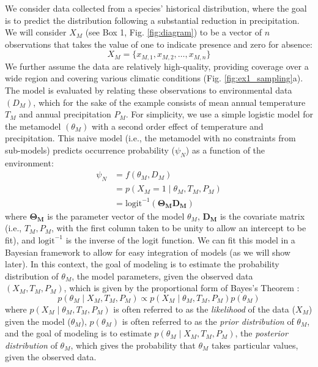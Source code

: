 \documentclass[11pt]{article}
\begin{document}
We consider data collected from a species' historical distribution, where the goal is to predict the distribution following a substantial reduction in precipitation. 
We will consider \(X_M\) (see Box 1, Fig. \ref{fig:diagram}) to be a vector of $n$ observations that takes the value of one to indicate presence and zero for absence:
\begin{equation}
X_M = \{x_{M,1}, x_{M,2}, \ldots, x_{M,n}\}
\end{equation}
We further assume the data are relatively high-quality, providing coverage over a wide region and covering various climatic conditions (Fig. \ref{fig:ex1_sampling}a). 
The model is evaluated by relating these observations to environmental data \((D_M)\), which for the sake of the example consists of mean annual temperature $T_M$ and annual precipitation $P_M$. 
For simplicity, we use a simple logistic model for the metamodel \((\theta_M)\) with a second order effect of temperature and precipitation. 
This naive model (i.e., the metamodel with no constraints from sub-models) predicts  occurrence probability (\(\psi_N\)) as a function of the environment:
\begin{equation}
\begin{aligned}
	\psi_N &= f\left(\theta_M, D_M \right) \\
	&= p \left (X_M = 1 \mid \theta_M, T_M, P_M \right) \\
	&=\text{logit}^{-1}\left( \mathbf{\Theta_M} \mathbf{D_M} \right)
\end{aligned}
\end{equation}
where \(\mathbf{\Theta_M}\) is the parameter vector of the model \(\theta_M\), \(\mathbf{D_M} \) is the covariate matrix (i.e., \(T_M, P_M\), with the first column taken to be unity to allow an intercept to be fit), and \(\text{logit}^{-1}\) is the inverse of the logit function.
We can fit this model in a Bayesian framework to allow for easy integration of models (as we will show later).
In this context, the goal of modeling is to estimate the probability distribution of \(\theta_M\), the model parameters, given the observed data \((X_M, T_M, P_M)\), which is given by the proportional form of Bayes's Theorem \citep[for readers unfamiliar with general concepts in Bayesian inference, a concise introduction can be found in ][]{Link2010}:
\begin{equation}
\label{eq:ex1_bayes}
	p\left (\theta_M \mid X_M,T_M,P_M \right ) \propto 
	p \left(X_M \mid \theta_M, T_M, P_M \right)
	p \left(\theta_M \right)
\end{equation}
where \(p\left(X_M \mid \theta_M, T_M, P_M \right)\) is often referred to as the \emph{likelihood} of the data (\(X_M\)) given the model (\(\theta_M\)), \(p\left(\theta_M \right)\) is often referred to as the \emph{prior distribution} of \(\theta_M\), and the goal of modeling is to estimate \(p\left (\theta_M \mid X_M,T_M,P_M \right )\), the \emph{posterior distribution} of \(\theta_M\), which gives the probability that \(\theta_M\) takes particular values, given the observed data.
\end{document}
